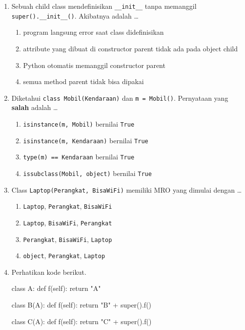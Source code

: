 \begin{enumerate}
  \item Sebuah child class mendefinisikan \texttt{\_\_init\_\_} tanpa memanggil \texttt{super().\_\_init\_\_()}. Akibatnya adalah \ldots
  \begin{enumerate}[label=\alph*.,itemsep=0pt]
    \item program langsung error saat class didefinisikan
    \item attribute yang dibuat di constructor parent tidak ada pada object child
    \item Python otomatis memanggil constructor parent
    \item semua method parent tidak bisa dipakai
  \end{enumerate}

  \item Diketahui \texttt{class Mobil(Kendaraan)} dan \texttt{m = Mobil()}. Pernyataan yang \textbf{salah} adalah \ldots
  \begin{enumerate}[label=\alph*.,itemsep=0pt]
    \item \texttt{isinstance(m, Mobil)} bernilai \texttt{True}
    \item \texttt{isinstance(m, Kendaraan)} bernilai \texttt{True}
    \item \texttt{type(m) == Kendaraan} bernilai \texttt{True}
    \item \texttt{issubclass(Mobil, object)} bernilai \texttt{True}
  \end{enumerate}

  \item Class \texttt{Laptop(Perangkat, BisaWiFi)} memiliki MRO yang dimulai dengan \ldots
  \begin{enumerate}[label=\alph*.,itemsep=0pt]
    \item \texttt{Laptop}, \texttt{Perangkat}, \texttt{BisaWiFi}
    \item \texttt{Laptop}, \texttt{BisaWiFi}, \texttt{Perangkat}
    \item \texttt{Perangkat}, \texttt{BisaWiFi}, \texttt{Laptop}
    \item \texttt{object}, \texttt{Perangkat}, \texttt{Laptop}
  \end{enumerate}

  \item Perhatikan kode berikut.
\begin{kode}[Soal 8]
class A:
    def f(self):
        return "A"

class B(A):
    def f(self):
        return "B" + super().f()

class C(A):
    def f(self):
        return "C" + super().f()


\end{kode}
\end{enumerate}
